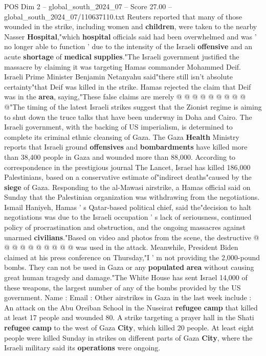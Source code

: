 \begin{textsample}{POS Dim 2 – global\_south\_2024\_07 – Score 27.00 – global\_south\_2024\_07/110637110.txt}
Reuters reported that many of those wounded in the strike, including women and \textbf{children}, were taken to the nearby Nasser \textbf{Hospital},"which \textbf{hospital} officials said had been overwhelmed and was ' no longer able to function ' due to the intensity of the Israeli \textbf{offensive} and an acute \textbf{shortage} of \textbf{medical} \textbf{supplies}."The Israeli government justified the massacre by claiming it was targeting Hamas commander Mohammed Deif.
Israeli Prime Minister Benjamin Netanyahu said"there still isn't absolute certainty"that Deif was killed in the strike.
Hamas rejected the claim that Deif was in the \textbf{area}, saying,"These false claims are merely @ @ @ @ @ @ @ @ @ @"The timing of the latest Israeli strikes suggest that the Zionist regime is aiming to shut down the truce talks that have been underway in Doha and Cairo.
The Israeli government, with the backing of US imperialism, is determined to complete its criminal ethnic cleansing of Gaza.
The Gaza \textbf{Health} Ministry reports that Israeli ground \textbf{offensives} and \textbf{bombardments} have killed more than 38,400 people in Gaza and wounded more than 88,000.
According to correspondence in the prestigious journal The Lancet, Israel has killed 186,000 Palestinians, based on a conservative estimate of"indirect deaths"caused by the \textbf{siege} of Gaza.
Responding to the al-Mawasi airstrike, a Hamas official said on Sunday that the Palestinian organization was withdrawing from the negotiations.
Ismail Haniyeh, Hamas ' s Qatar-based political chief, said the"decision to halt negotiations was due to the Israeli occupation ' s lack of seriousness, continued policy of procrastination and obstruction, and the ongoing massacres against unarmed \textbf{civilians}."Based on video and photos from the scene, the destructive @ @ @ @ @ @ @ @ @ @ was used in the attack.
Meanwhile, President Biden claimed at his press conference on Thursday,"I ' m not providing the 2,000-pound bombs.
They can not be used in Gaza or any \textbf{populated} \textbf{area} without causing great human tragedy and damage."The White House has sent Israel 14,000 of these weapons, the largest number of any of the bombs provided by the US government.
Name : Email : Other airstrikes in Gaza in the last week include : An attack on the Abu Oreiban School in the Nuseirat \textbf{refugee} \textbf{camp} that killed at least 17 people and wounded 80.
A strike targeting a prayer hall in the Shati \textbf{refugee} \textbf{camp} to the west of Gaza \textbf{City}, which killed 20 people.
At least eight people were killed Sunday in strikes on different parts of Gaza \textbf{City}, where the Israeli military said its \textbf{operations} were ongoing.

\end{textsample}

